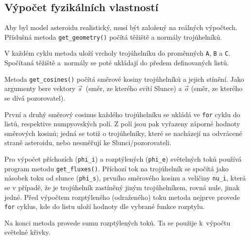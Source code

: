 \documentclass[11pt]{article}
\begin{document}
\subsection{Výpočet fyzikálních vlastností}

Aby byl model asteroidu realistický, musí být založený na reálných výpočtech. Příslušná metoda \verb|get_geometry()| počítá těžiště a normály trojúhelníků. 



V každém cyklu metoda uloží vrcholy trojúhelníku do proměnných \verb|A|, \verb|B| a \verb|C|. Spočítaná těžiště a~normály se poté ukládají do předem definovaných listů.



Metoda \verb|get_cosines()| počítá směrové kosiny trojúhelníků a jejich stínění. Jako argumenty bere vektory $\vec s$~(směr, ze kterého svítí Slunce) a $\vec o$ (směr, ze kterého se dívá pozorovatel). 



První a druhý směrový cosinus každého trojúhelníku se ukládá ve \verb|for| cyklu do listů, respektive numpyovských polí. Z polí jsou pak vyřazeny záporné hodnoty směrových kosinů; jedná se totiž o trojúhelníky, které se nacházejí na odvrácené straně asteroidu, nebo nesměřují ke Slunci/pozorovateli. 



Pro výpočet příchozích (\verb|phi_i|) a rozptýlených (\verb|phi_e|) světelných toků používá program metodu \verb|get_fluxes()|. Příchozí tok na trojúhelník se spočítá jako násobek toku od slunce (\verb|phi_s|), prvního směrového kosinu a veličiny \verb|nu_i|, která se v případě, že je trojúhelník zastíněný jiným trojúhelníkem, rovná nule, jinak jedné. Před výpočtem rozptýleného (odraženého) toku metoda nejprve provede \verb|for| cyklus, kde do listu uloží hodnoty dle vybrané funkce rozptylu.   



Na konci metoda provede sumu rozptýlených toků. Ta se použije k~výpočtu světelné křivky. 

\end{document}
